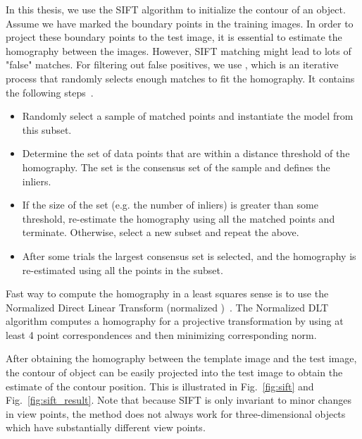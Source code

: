 
In this thesis, we use the SIFT algorithm to initialize the
contour of an object. Assume we have marked the boundary points in the
training images. In order to project these boundary points to the test
image, it is essential to estimate the homography between the
images. However, SIFT matching
might lead to lots of "false" matches. %
For filtering out false positives, we use , which is an
iterative process that randomly selects enough matches to fit the
homography. It contains the following steps~\cite{fischler1981random}.

\begin{itemize}
\item  Randomly select a sample of matched points and instantiate the
  model from this subset.
\item Determine the set of data points that are within a distance
  threshold of the homography. The set is the consensus set of the sample
  and defines the inliers.
\item If the size of the set (e.g. the number of inliers) is greater
  than some threshold, re-estimate the homography using all the matched
  points and terminate. Otherwise, select a new subset and repeat the
  above.
\item After some trials the largest consensus set is selected, and the
  homography is re-estimated using all the points in the subset.
\end{itemize}
Fast way to compute the homography in a least squares sense is to use the Normalized
Direct Linear Transform (normalized
)~\cite{hartley2003multiple}. The Normalized DLT algorithm computes
a homography for a projective transformation by using at least 4 point
correspondences and then minimizing corresponding norm.

After obtaining the homography between the template image and the
test image, the contour of object can be easily projected
into the test image to obtain the estimate of the contour
position. This is illustrated in Fig.~\ref{fig:sift} and
Fig.~\ref{fig:sift_result}. Note that because SIFT is only invariant
to minor changes in view points, the method does not always work for
three-dimensional objects which have substantially different view points.

